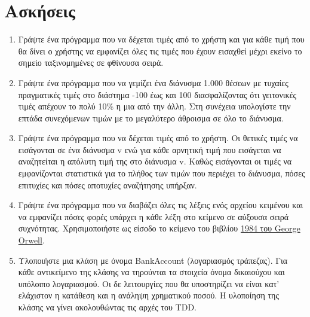 



\section{Ασκήσεις}
\begin{enumerate}
\item Γράψτε ένα πρόγραμμα που να δέχεται τιμές από το χρήστη και για κάθε τιμή που θα δίνει ο χρήστης να εμφανίζει όλες τις τιμές που έχουν εισαχθεί μέχρι εκείνο το σημείο ταξινομημένες σε φθίνουσα σειρά. 
\item Γράψτε ένα πρόγραμμα που να γεμίζει ένα διάνυσμα 1.000 θέσεων με τυχαίες πραγματικές τιμές στο διάστημα -100 έως και 100 διασφαλίζοντας ότι γειτονικές τιμές απέχουν το πολύ 10\% η μια από την άλλη. Στη συνέχεια υπολογίστε την επτάδα συνεχόμενων τιμών με το μεγαλύτερο άθροισμα σε όλο το διάνυσμα.
\item Γράψτε ένα πρόγραμμα που να δέχεται τιμές από το χρήστη. Οι θετικές τιμές να εισάγονται σε ένα διάνυσμα v ενώ για κάθε αρνητική τιμή που εισάγεται να αναζητείται η απόλυτη τιμή της στο διάνυσμα v. Καθώς εισάγονται οι τιμές να εμφανίζονται στατιστικά για το πλήθος των τιμών που περιέχει το διάνυσμα, πόσες επιτυχίες και πόσες αποτυχίες αναζήτησης υπήρξαν.
\item Γράψτε ένα πρόγραμμα που να διαβάζει όλες τις λέξεις ενός αρχείου κειμένου και να εμφανίζει πόσες φορές υπάρχει η κάθε λέξη στο κείμενο σε αύξουσα σειρά συχνότητας. Χρησιμοποιήστε ως είσοδο το κείμενο του βιβλίου \href{http://gutenberg.net.au/ebooks01/0100021.txt}{1984 του George Orwell}.
\item Υλοποιήστε μια κλάση με όνομα BankAccount (λογαριασμός τράπεζας). Για κάθε αντικείμενο της κλάσης να τηρούνται τα στοιχεία όνομα δικαιούχου και υπόλοιπο λογαριασμού. Οι δε λειτουργίες που θα υποστηρίζει να είναι κατ' ελάχιστον η κατάθεση και η ανάληψη χρηματικού ποσού. Η υλοποίηση της κλάσης να γίνει ακολουθώντας τις αρχές του TDD.
\end{enumerate}

